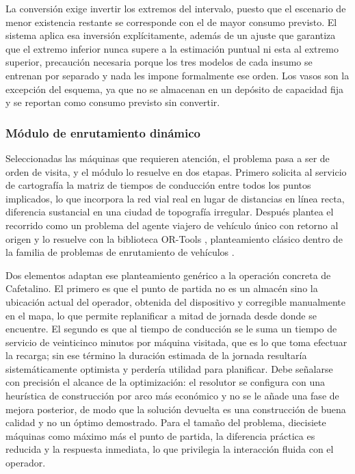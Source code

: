 La conversión exige invertir los extremos del intervalo, puesto que el escenario de menor existencia restante se corresponde con el de mayor consumo previsto. El sistema aplica esa inversión explícitamente, además de un ajuste que garantiza que el extremo inferior nunca supere a la estimación puntual ni esta al extremo superior, precaución necesaria porque los tres modelos de cada insumo se entrenan por separado y nada les impone formalmente ese orden. Los vasos son la excepción del esquema, ya que no se almacenan en un depósito de capacidad fija y se reportan como consumo previsto sin convertir.

\subsubsection{Módulo de enrutamiento dinámico}\label{modulo-de-enrutamiento-dinamico}

Seleccionadas las máquinas que requieren atención, el problema pasa a ser de orden de visita, y el módulo lo resuelve en dos etapas. Primero solicita al servicio de cartografía la matriz de tiempos de conducción entre todos los puntos implicados, lo que incorpora la red vial real en lugar de distancias en línea recta, diferencia sustancial en una ciudad de topografía irregular. Después plantea el recorrido como un problema del agente viajero de vehículo único con retorno al origen y lo resuelve con la biblioteca OR-Tools \citep{ortools2026}, planteamiento clásico dentro de la familia de problemas de enrutamiento de vehículos \citep{tothvigo2014}.

Dos elementos adaptan ese planteamiento genérico a la operación concreta de Cafetalino. El primero es que el punto de partida no es un almacén sino la ubicación actual del operador, obtenida del dispositivo y corregible manualmente en el mapa, lo que permite replanificar a mitad de jornada desde donde se encuentre. El segundo es que al tiempo de conducción se le suma un tiempo de servicio de veinticinco minutos por máquina visitada, que es lo que toma efectuar la recarga; sin ese término la duración estimada de la jornada resultaría sistemáticamente optimista y perdería utilidad para planificar. Debe señalarse con precisión el alcance de la optimización: el resolutor se configura con una heurística de construcción por arco más económico y no se le añade una fase de mejora posterior, de modo que la solución devuelta es una construcción de buena calidad y no un óptimo demostrado. Para el tamaño del problema, diecisiete máquinas como máximo más el punto de partida, la diferencia práctica es reducida y la respuesta inmediata, lo que privilegia la interacción fluida con el operador.

